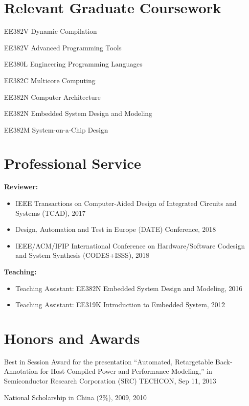 \documentclass[letterpaper,11pt]{article}
\newcommand{\resumeItemList}[1]{
{\justifying
  \item{#1 \vspace{-6pt}}
\par}
}
\newcommand{\resumeSubHeadingListStart}{\begin{itemize}[leftmargin=*]}
\newcommand{\resumeSubHeadingListEnd}{\end{itemize}}
\newcommand{\resumeItemListStart}{\begin{itemize}}
\newcommand{\resumeItemListEnd}{\end{itemize}\vspace{-5pt}}
\begin{document}
\section{Relevant Graduate Coursework}
  \resumeSubHeadingListStart
	\resumeItemList{EE382V Dynamic Compilation}
	\resumeItemList{EE382V Advanced Programming Tools}
	\resumeItemList{EE380L Engineering Programming Languages}
	\resumeItemList{EE382C Multicore Computing}
	\resumeItemList{EE382N Computer Architecture}
	\resumeItemList{EE382N Embedded System Design and Modeling}
	\resumeItemList{EE382M System-on-a-Chip Design}
  \resumeSubHeadingListEnd


\section{Professional Service}
  \resumeSubHeadingListStart
	\resumeItemList{\bf Reviewer:\vspace{-5pt}}
	\resumeItemListStart
		\item IEEE Transactions on Computer-Aided Design of Integrated Circuits and Systems (TCAD), 2017 \vspace{-3pt}
		\item Design, Automation and Test in Europe (DATE) Conference, 2018 \vspace{-3pt}
		\item IEEE/ACM/IFIP International Conference on Hardware/Software Codesign and System Synthesis (CODES+ISSS), 2018 \vspace{-3pt}
	\resumeItemListEnd

	\resumeItemList{\bf Teaching:\vspace{-5pt}}
	\resumeItemListStart
		\item Teaching Assistant:  EE382N Embedded System Design and Modeling, 2016 \vspace{-3pt}
		\item Teaching Assistant: EE319K Introduction to Embedded System, 2012 \vspace{-3pt}
	\resumeItemListEnd
  \resumeSubHeadingListEnd

\section{Honors and Awards}
  \resumeSubHeadingListStart
    \resumeItemList{Best in Session Award for the presentation ``Automated, Retargetable Back-Annotation for Host-Compiled Power
and Performance Modeling,'' in Semiconductor Research Corporation (SRC) TECHCON, Sep 11, 2013}
    \resumeItemList{National Scholarship in China (2\%), 2009, 2010}
  \resumeSubHeadingListEnd

\end{document}
